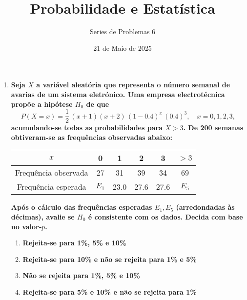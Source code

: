 \documentclass[a4paper,12pt]{article}
\author{Series de Problemas 6}
\begin{document}
\title{Probabilidade e Estatística}
\date{21 de Maio de 2025}
\maketitle


\begin{enumerate}
    \item \textbf{Seja \( X \) a variável aleatória que representa o número semanal de avarias de um sistema eletrónico. Uma empresa electrotécnica propõe a hipótese \( H_0 \) de que}
    \[
    P(X = x) = \frac12\,(x + 1)(x + 2)\,(1 - 0.4)^x\,(0.4)^3,\quad x = 0,1,2,3,
    \]
    \textbf{acumulando-se todas as probabilidades para \(X>3\). De 200 semanas obtiveram‑se as frequências observadas abaixo:}

    \begin{center}
    \small
    \renewcommand{\arraystretch}{1.5}
    \setlength{\tabcolsep}{8pt}
    \begin{tabular}{|c|c|c|c|c|c|}
    \hline
    \(x\) & 0 & 1 & 2 & 3 & \(>3\) \\ \hline
    Frequência observada & 27 & 31 & 39 & 34 & 69 \\ \hline
    Frequência esperada  & \(E_1\) & 23.0 & 27.6 & 27.6 & \(E_5\) \\ \hline
    \end{tabular}
    \end{center}

    \vspace{0.3cm}

    \textbf{Após o cálculo das frequências esperadas \(E_1,E_5\) (arredondadas às décimas), avalie se \(H_0\) é consistente com os dados. Decida com base no valor‑\(p\).}

    \vspace{0.3cm}

    \begin{enumerate}[label=\Alph*)]
        \item \textbf{Rejeita-se para 1\%, 5\% e 10\%}
        \item \textbf{Rejeita-se para 10\% e não se rejeita para 1\% e 5\%}
        \item \textbf{Não se rejeita para 1\%, 5\% e 10\%}
        \item \textbf{Rejeita-se para 5\% e 10\% e não se rejeita para 1\%}
    \end{enumerate}

    \vspace{0.3cm}


\end{enumerate}
\end{document}
